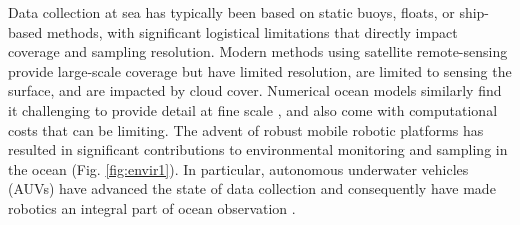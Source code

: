 \documentclass[aoas]{imsart}
\begin{document}
Data collection at sea has typically been based on static buoys,
floats, or ship-based methods, with significant logistical limitations
that directly impact coverage and sampling resolution. Modern methods
using satellite remote-sensing provide large-scale coverage but have
limited resolution, are limited to sensing the surface, and are
impacted by cloud cover. Numerical ocean models similarly find it
challenging to provide detail at fine scale \citep{Lermusiaux:2006},
and also come with computational costs that can be limiting. The
advent of robust mobile robotic platforms \citep{Bellingham07} has
resulted in significant contributions to environmental monitoring and
sampling in the ocean (Fig. \ref{fig:envir1}). In particular,
autonomous underwater vehicles (AUVs) have advanced the state of data
collection and consequently have made robotics an integral part of
ocean observation \citep{das11b,Das2015,fossuminformation,fossum18b}.
\end{document}

